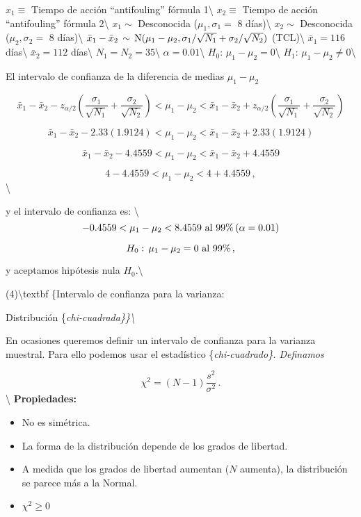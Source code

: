\documentclass[
]{agujournal2019}
\begin{document}
\(x_1\equiv\) Tiempo de acción ``antifouling'' fórmula 1\textbackslash{}
\(x_2\equiv\) Tiempo de acción ``antifouling'' fórmula 2\textbackslash{}
\(x_1\sim\) Desconocida (\(\mu_1,\sigma_1=\) 8 días)\textbackslash{}
\(x_2\sim\) Desconocida (\(\mu_2,\sigma_2=\) 8 días)\textbackslash{}
\(\bar{x}_1-\bar{x}_2\,\sim\,{\rm N}(\mu_1-\mu_2,\sigma_1/\sqrt{N_1} + \sigma_2/\sqrt{N_2})\)
(TCL)\textbackslash{} \(\bar{x}_1=116\) días\textbackslash{}
\(\bar{x}_2=112\) días\textbackslash{} \(N_1=N_2=35\)\textbackslash{}
\(\alpha=0.01\)\textbackslash{}
\(H_0:\,\mu_1 - \mu_2 =0\)\textbackslash{}
\(H_1:\,\mu_1 - \mu_2 \neq0\)\textbackslash{}

El intervalo de confianza de la diferencia de medias \(\mu_1-\mu_2\)

\[\bar{x}_1-\bar{x}_2-z_{\alpha/2} \left(
   \frac{\sigma_1}{\sqrt{N_1}} + \frac{\sigma_2}{\sqrt{N_2}}\right)<
   \mu_1-\mu_2 <
   \bar{x}_1-\bar{x}_2+z_{\alpha/2} \left(
   \frac{\sigma_1}{\sqrt{N_1}} + \frac{\sigma_2}{\sqrt{N_2}}\right)\]

\[\bar{x}_1-\bar{x}_2-2.33 (1.9124)<
   \mu_1-\mu_2 <
   \bar{x}_1-\bar{x}_2+2.33 (1.9124)\]

\[\bar{x}_1-\bar{x}_2-4.4559<
   \mu_1-\mu_2 <
   \bar{x}_1-\bar{x}_2+4.4559\]

\[4-4.4559<
   \mu_1-\mu_2 <
   4+4.4559\,,\] \textbackslash{}

y el intervalo de confianza es: \textbackslash{}
\[-0.4559<\mu_1-\mu_2<8.4559\,\,{\rm al}\,\,99\%\,(\alpha=0.01)\]

\[H_0:\,\mu_1 - \mu_2 = 0\,\,{\rm al}\,\,99\%\,,\]

y aceptamos hipótesis nula \(H_0\).\textbackslash{}

(4)\textbackslash textbf \{Intervalo de confianza para la varianza:

Distribución \{\it chi-cuadrada\}\}\textbackslash{}

En ocasiones queremos definir un intervalo de confianza para la varianza
muestral. Para ello podemos usar el estadístico \{\it chi-cuadrado\}.
Definamos

\[\chi^2=(N-1)\frac{s^2}{\sigma^2}\,.\] \textbackslash{}
\textbf {Propiedades:}

\begin{itemize}
\item No es simétrica.
\item La forma de la distribución depende de los grados de libertad.
\item A medida que los grados de libertad aumentan ($N$ aumenta),
la distribución se parece más a la Normal.
\item $\chi^2\geq0$
\end{itemize}
\end{document}
